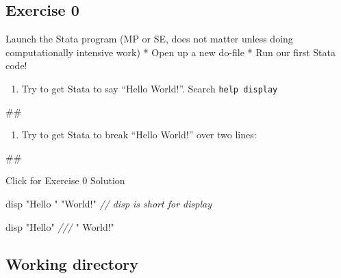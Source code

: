 \documentclass[
]{book}
\newenvironment{Shaded}{\begin{snugshade}}{\end{snugshade}}
\newcommand{\CommentTok}[1]{\textcolor[rgb]{0.56,0.35,0.01}{\textit{#1}}}
\newcommand{\NormalTok}[1]{#1}
\newcommand{\StringTok}[1]{\textcolor[rgb]{0.31,0.60,0.02}{#1}}
\providecommand{\tightlist}{%
  \setlength{\itemsep}{0pt}\setlength{\parskip}{0pt}}
\begin{document}
\hypertarget{exercise-0-5}{%
\subsection{Exercise 0}\label{exercise-0-5}}

Launch the Stata program (MP or SE, does not matter unless doing computationally intensive work)
* Open up a new do-file
* Run our first Stata code!

\begin{enumerate}
\def\labelenumi{\arabic{enumi}.}
\tightlist
\item
  Try to get Stata to say ``Hello World!''. Search \texttt{help\ display}
\end{enumerate}

\begin{Shaded}
\begin{Highlighting}[]
\NormalTok{\#\#}
\end{Highlighting}
\end{Shaded}

\begin{enumerate}
\def\labelenumi{\arabic{enumi}.}
\setcounter{enumi}{1}
\tightlist
\item
  Try to get Stata to break ``Hello World!'' over two lines:
\end{enumerate}

\begin{Shaded}
\begin{Highlighting}[]
\NormalTok{\#\#}
\end{Highlighting}
\end{Shaded}

{Click for Exercise 0 Solution}

\begin{alert}

\begin{Shaded}
\begin{Highlighting}[]
\NormalTok{disp }\StringTok{"Hello "} \StringTok{"World!"} \CommentTok{// \textquotesingle{}disp\textquotesingle{} is short for \textquotesingle{}display\textquotesingle{}}

\NormalTok{disp }\StringTok{"Hello"} \CommentTok{///}
     \StringTok{" World!"}
\end{Highlighting}
\end{Shaded}

\end{alert}

\hypertarget{working-directory}{%
\subsection{Working directory}\label{working-directory}}
\end{document}
